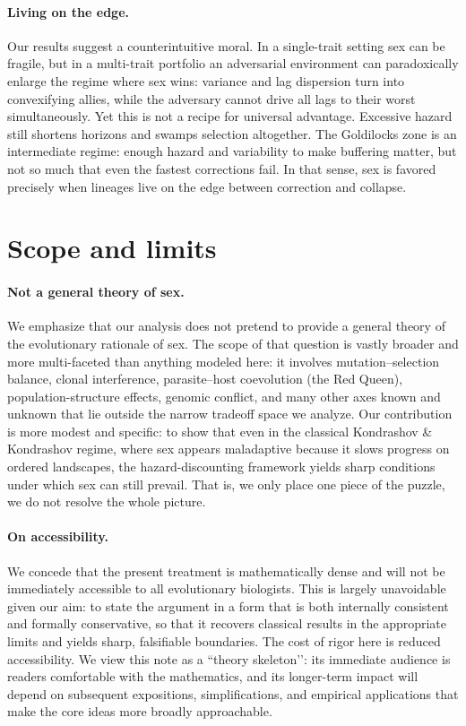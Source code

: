 \documentclass[11pt]{article}
\theoremstyle{upright}
\begin{document}
\paragraph{Living on the edge.}
Our results suggest a counterintuitive moral. In a single-trait setting sex can
be fragile, but in a multi-trait portfolio an adversarial environment can
paradoxically enlarge the regime where sex wins: variance and lag dispersion
turn into convexifying allies, while the adversary cannot drive all lags to
their worst simultaneously. Yet this is not a recipe for universal advantage.
Excessive hazard still shortens horizons and swamps selection altogether. The
Goldilocks zone is an intermediate regime: enough hazard and variability to make
buffering matter, but not so much that even the fastest corrections fail. In
that sense, sex is favored precisely when lineages live on the edge between
correction and collapse.


\section{Scope and limits}
\label{sec:scope}

\paragraph{Not a general theory of sex.}
We emphasize that our analysis does not pretend to provide a general theory of
the evolutionary rationale of sex. The scope of that question is vastly broader
and more multi-faceted than anything modeled here: it involves mutation–selection
balance, clonal interference, parasite–host coevolution (the Red Queen),
population-structure effects, genomic conflict, and many other axes known and unknown that lie
outside the narrow tradeoff space we analyze. Our contribution is more modest and
specific: to show that even in the classical Kondrashov \& Kondrashov regime,
where sex appears maladaptive because it slows progress on ordered landscapes,
the hazard-discounting framework yields sharp conditions under which sex can
still prevail. That is, we only place one piece of the puzzle, we do not resolve the whole picture.

\paragraph{On accessibility.}
We concede that the present treatment is mathematically dense and will not be immediately accessible to all evolutionary biologists. This is largely unavoidable given our aim: to state the argument in a form that is both internally consistent and formally conservative, so that it recovers classical results in the appropriate limits and yields sharp, falsifiable boundaries. The cost of rigor here is reduced accessibility. We view this note as a “theory skeleton’’: its immediate audience is readers comfortable with the mathematics, and its longer-term impact will depend on subsequent expositions, simplifications, and empirical applications that make the core ideas more broadly approachable.
\end{document}
